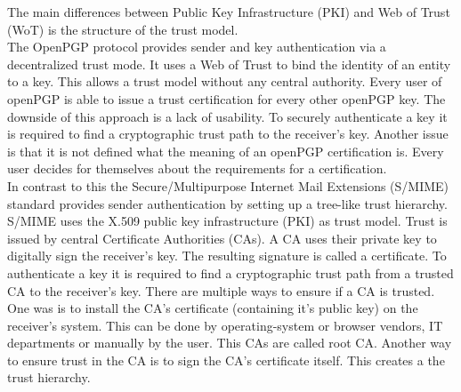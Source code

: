 The main differences between Public Key Infrastructure (PKI) and Web of Trust (WoT) is the structure of the trust model.  \\

The OpenPGP protocol provides sender and key authentication via a decentralized trust mode. It uses a Web of Trust to bind the identity of an entity to a key. This allows a trust model without any central authority. Every user of openPGP is able to issue a trust certification for every other openPGP key. The downside of this approach is a lack of usability. To securely authenticate a key it is required to find a cryptographic trust path to the receiver's key. Another issue is that it is not defined what the meaning of an openPGP certification is. Every user decides for themselves about the requirements for a certification. \\

In contrast to this the Secure/Multipurpose Internet Mail Extensions (S/MIME) standard provides sender authentication by setting up a tree-like trust hierarchy. S/MIME uses the X.509 public key infrastructure (PKI) as trust model. Trust is issued by central Certificate Authorities (CAs). A CA uses their private key to digitally sign the receiver's key. The resulting signature is called a certificate. To authenticate a key it is required to find a cryptographic trust path from a trusted CA to the receiver's key. There are multiple ways to ensure if a CA is trusted. One was is to install the CA's certificate (containing it's public key) on the receiver's system. This can be done by operating-system or browser vendors, IT departments or manually by the user. This CAs are called root CA. Another way to ensure trust in the CA is to sign the CA's certificate itself. This creates a the trust hierarchy. 




